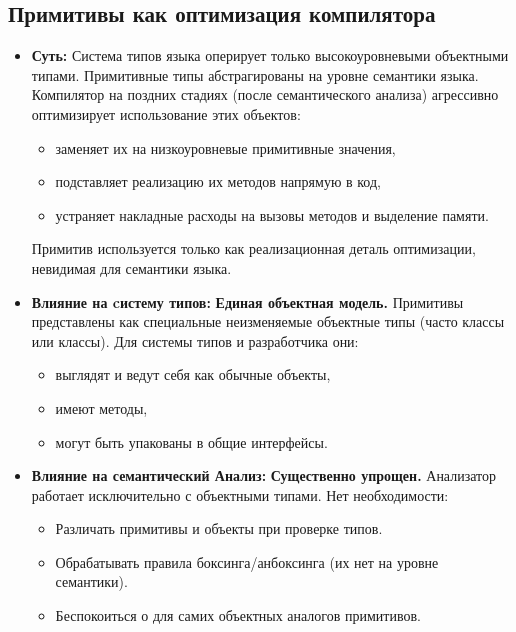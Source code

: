 \subsection{Примитивы как оптимизация компилятора}
\begin{itemize}[label={--}, leftmargin=*]
    \item \textbf{Суть:} Система типов языка оперирует только высокоуровневыми объектными типами. Примитивные типы абстрагированы на уровне семантики языка. Компилятор на поздних стадиях (после семантического анализа) агрессивно оптимизирует использование этих объектов:
    \begin{itemize}[label={--}]
        \item заменяет их на низкоуровневые примитивные значения,
        \item подставляет реализацию их методов напрямую в код,
        \item устраняет накладные расходы на вызовы методов и выделение памяти.
    \end{itemize}
    Примитив используется только как реализационная деталь оптимизации, невидимая для семантики языка.

    \item \textbf{Влияние на cистему типов:} \textbf{Единая объектная модель.} Примитивы представлены как специальные неизменяемые объектные типы (часто  классы или  классы). Для системы типов и разработчика они:
    \begin{itemize}[label={--}]
        \item выглядят и ведут себя как обычные объекты,
        \item имеют методы,
        \item могут быть упакованы в общие интерфейсы.
    \end{itemize}

    \item \textbf{Влияние на семантический Анализ:} \textbf{Существенно упрощен.} Анализатор работает исключительно с объектными типами. Нет необходимости:
    \begin{itemize}[label={--}]
        \item Различать примитивы и объекты при проверке типов.
        \item Обрабатывать правила боксинга/анбоксинга (их нет на уровне семантики).
        \item Беспокоиться о  для самих объектных аналогов примитивов.
    \end{itemize}


\end{itemize}
